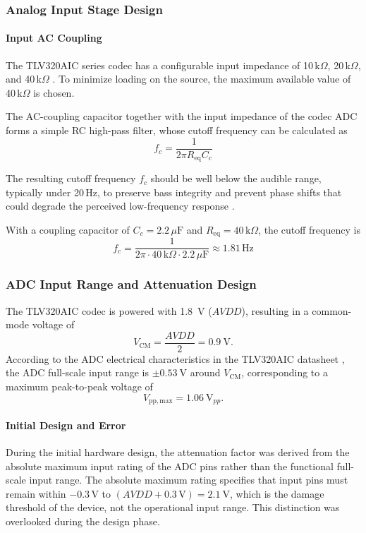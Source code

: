 \subsubsection{Analog Input Stage Design}

\paragraph{Input AC Coupling}

The TLV320AIC series codec has a configurable input impedance of 10\,k$\Omega$, 20\,k$\Omega$, and 40\,k$\Omega$ \cite{TLV320AIC3204ApplicationReference2012}. To minimize loading on the source, the maximum available value of 40\,k$\Omega$ is chosen.

The AC-coupling capacitor together with the input impedance of the codec ADC forms a simple RC high-pass filter, whose cutoff frequency can be calculated as
\[
f_c = \frac{1}{2 \pi R_\text{eq} C_c}
\]

The resulting cutoff frequency $f_c$ should be well below the audible range, typically under 20\,Hz, to preserve bass integrity and prevent phase shifts that could degrade the perceived low-frequency response \cite{audio_phase_shift}.  

With a coupling capacitor of $C_c = 2.2\,\mu\text{F}$ and $R_\text{eq} = 40\,\text{k}\Omega$, the cutoff frequency is
\[
f_c = \frac{1}{2 \pi \cdot 40\,\text{k}\Omega \cdot 2.2\,\mu\text{F}} \approx 1.81\,\text{Hz}
\]


\subsubsection{ADC Input Range and Attenuation Design}

The TLV320AIC codec is powered with \SI{1.8}{\volt} (\(AVDD\)), resulting in a 
common-mode voltage of
\[
V_\mathrm{CM} = \frac{AVDD}{2} = \SI{0.9}{\volt}.
\]
According to the ADC electrical characteristics in the TLV320AIC datasheet 
\cite[p.~9]{texasinstrumentsTlv320aic3204Datasheet}, the ADC full-scale input range 
is \(\pm \SI{0.53}{\volt}\) around \(V_\mathrm{CM}\), corresponding to a maximum 
peak-to-peak voltage of
\[
V_\mathrm{pp,max} = \SI{1.06}{\volt_{pp}}.
\]

\paragraph{Initial Design and Error}

During the initial hardware design, the attenuation factor was derived from the 
absolute maximum input rating of the ADC pins rather than the functional full-scale 
input range. The absolute maximum rating specifies that input pins must remain within 
\(-0.3\,\mathrm{V}\) to \((AVDD + 0.3\,\mathrm{V}) = \SI{2.1}{\volt}\), which is 
the damage threshold of the device, not the operational input range. This distinction 
was overlooked during the design phase.

